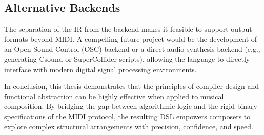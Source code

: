 \subsection{Alternative Backends}
The separation of the IR from the backend makes it feasible to support output formats beyond MIDI. A
compelling future project would be the development of an Open Sound Control (OSC) backend or a direct audio
synthesis backend (e.g., generating Csound or SuperCollider scripts), allowing the language to directly
interface with modern digital signal processing environments.

\vspace{1cm}
In conclusion, this thesis demonstrates that the principles of compiler design and functional abstraction can
be highly effective when applied to musical composition. By bridging the gap between algorithmic logic and
the rigid binary specifications of the MIDI protocol, the resulting DSL empowers composers to explore complex
structural arrangements with precision, confidence, and speed.
